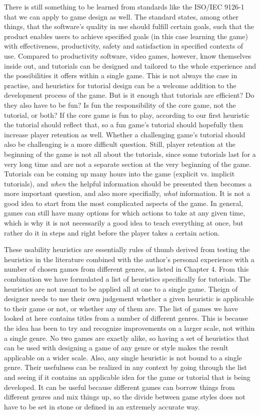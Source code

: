 There is still something to be learned from standards like the ISO/IEC 9126-1 that we can apply to game design as well. The standard states, among other things, that the software's quality in use should fulfill certain goals, such that the product enables users to achieve specified goals (in this case learning the game) with effectiveness, productivity, safety and satisfaction in specified contexts of use. Compared to productivity software, video games, however, know themselves inside out, and tutorials can be designed and tailored to the whole experience and the possibilities it offers within a single game. This is not always the case in practise, and heuristics for tutorial design can be a welcome addition to the development process of the game. But is it enough that tutorials are efficient? Do they also have to be fun? Is fun the responsibility of the core game, not the tutorial, or both? If the core game is fun to play, according to our first heuristic the tutorial should reflect that, so a fun game's tutorial should hopefully then increase player retention as well. Whether a challenging game's tutorial should also be challenging is a more difficult question. Still, player retention at the beginning of the game is not all about the tutorials, since some tutorials last for a very long time and are not a separate section at the very beginning of the game. Tutorials can be coming up many hours into the game (explicit vs. implicit tutorials), and \textit{when} the helpful information should be presented then becomes a more important question, and also more specifially, \textit{what} information. It is not a good idea to start from the most complicated aspects of the game.  In general, games can still have many options for which actions to take at any given time, which is why it is not necessarily a good idea to teach everything at once, but rather do it in steps and right before the player takes a certain action.

These usability heuristics are essentially rules of thumb derived from testing the heuristics in the literature combined with the author's personal experience with a number of chosen games from different genres, as listed in Chapter 4. From this combination we have formulated a list of heuristics specifically for tutorials. The heuristics are not meant to be applied all at one to a single game. Theign of designer needs to use their own judgement whether a given heuristic is applicable to their game or not, or whether any of them are. The list of games we have looked at here contains titles from a number of different genres. This is because the idea has been to try and recognize improvements on a larger scale, not within a single genre. No two games are exactly alike, so having a set of heuristics that can be used with designing a game of any genre or style makes the result applicable on a wider scale. Also, any single heuristic is not bound to a single genre. Their usefulness can be realized in any context by going through the list and seeing if it contains an applicable idea for the game or tutorial that is being developed. It can be useful because different games can borrow things from different genres and mix things up, so the divide between game styles does not have to be set in stone or defined in an extremely accurate way. 

